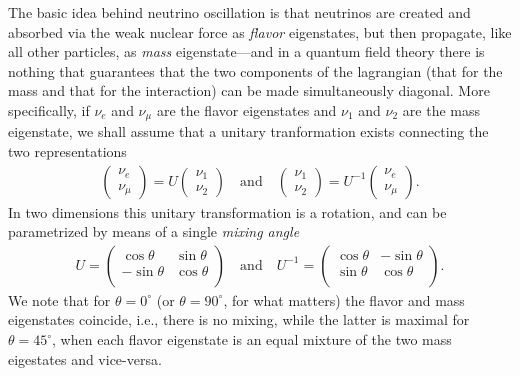 The basic idea behind neutrino oscillation is that neutrinos are created and absorbed
via the weak nuclear force as \emph{flavor} eigenstates, but then propagate, like all
other particles, as \emph{mass} eigenstate---and in a quantum field theory there is
nothing that guarantees that the two components of the lagrangian (that for the mass and that
for the interaction) can be made simultaneously diagonal. More specifically, if
$\nu_e$ and $\nu_\mu$ are the flavor eigenstates and $\nu_1$ and $\nu_2$
are the mass eigenstate, we shall assume that a unitary tranformation exists connecting
the two representations
\begin{align*}
  \begin{pmatrix}\nu_e\\ \nu_\mu\end{pmatrix} = U
  \begin{pmatrix}\nu_1\\ \nu_2 \end{pmatrix}
  \quad\text{and}\quad
  \begin{pmatrix}\nu_1\\ \nu_2 \end{pmatrix} = U^{-1}
  \begin{pmatrix}\nu_e\\ \nu_\mu\end{pmatrix}.
\end{align*}
In two dimensions this unitary transformation is a rotation, and can be parametrized
by means of a single \emph{mixing angle}
\begin{align*}
  U =
  \begin{pmatrix}
    \cos\theta & \sin\theta \\
    -\sin\theta & \cos\theta \\
  \end{pmatrix}
  \quad\text{and}\quad
  U^{-1} =
  \begin{pmatrix}
    \cos\theta & -\sin\theta \\
    \sin\theta & \cos\theta \\
  \end{pmatrix}.
\end{align*}
We note that for $\theta = 0^\circ$ (or $\theta = 90^\circ$, for what matters) the
flavor and mass eigenstates coincide, i.e., there is no mixing, while the latter
is maximal for $\theta = 45^\circ$, when each flavor eigenstate is an equal mixture
of the two mass eigestates and vice-versa.

